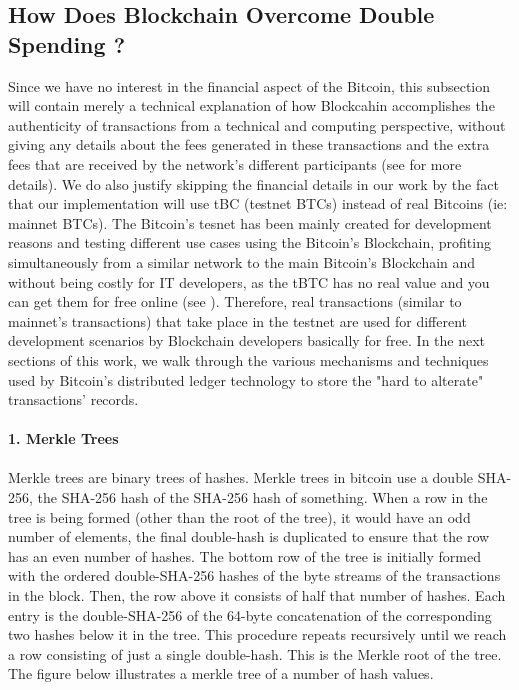 \subsection{How Does Blockchain Overcome Double Spending ? }
Since we have no interest in the financial aspect of the Bitcoin, this subsection will contain merely a technical explanation of how Blockcahin accomplishes the authenticity of transactions from a technical and computing perspective, without giving any details about the fees generated in these transactions and the extra fees that are received by the network's different participants (see \cite{satoshi} for more details). We do also justify skipping the financial details in our work by the fact that our implementation will use tBC \cite{test} (testnet BTCs) instead of real Bitcoins (ie: mainnet BTCs). The Bitcoin's tesnet has been mainly created for development reasons and testing different use cases using the Bitcoin's Blockchain, profiting  simultaneously from a similar network to the main Bitcoin's Blockchain and without being costly for IT developers, as the tBTC has no real value and you can get them for free online (see \cite{faucet}). Therefore, real transactions (similar to mainnet's transactions) that take place in the testnet are used for different development scenarios by Blockchain developers basically for free. In the next sections of this work, we walk through the various mechanisms and techniques used by Bitcoin's distributed ledger technology to store the "hard to alterate" transactions' records. \\
\\
\textbf{\large{1. Merkle Trees \cite{merkle}}}\\ 
\\ 
Merkle trees are binary trees of hashes. Merkle trees in bitcoin use a double SHA-256, the SHA-256 hash of the SHA-256 hash of something. When a row in the tree is being formed (other than the root of the tree), it would have an odd number of elements, the final double-hash is duplicated to ensure that the row has an even number of hashes. The bottom row of the tree is initially formed with the ordered double-SHA-256 hashes of the byte streams of the transactions in the block. Then, the row above it consists of half that number of hashes. Each entry is the double-SHA-256 of the 64-byte concatenation of the corresponding two hashes below it in the tree. This procedure repeats recursively until we reach a row consisting of just a single double-hash. This is the Merkle root of the tree. The figure below illustrates a merkle tree of a number of hash values.
